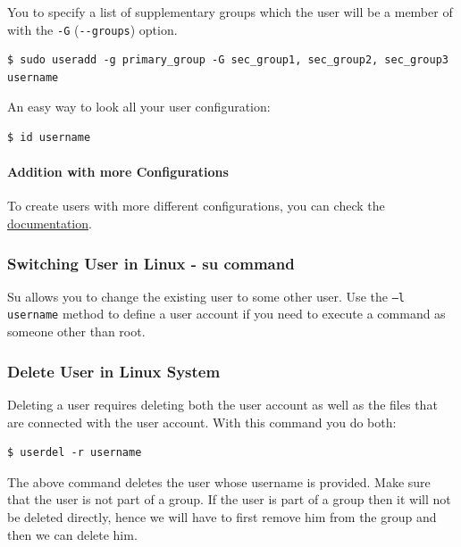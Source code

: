\documentclass{article}
\newenvironment{blocktemplateI}[1]{%
    \tcolorbox[beamer,%
    noparskip,breakable,
    colframe=Violet,%
    colbacklower=Black,%
    title=#1]}%
    {\endtcolorbox}
\newenvironment{blocktemplateIII}[1]{%
    \tcolorbox[beamer,%
    noparskip,breakable,
    ,colframe=Red,%
    colbacklower=LimeGreen!75!LightGreen,%
    title=#1]}%
    {\endtcolorbox}
\newenvironment{codetemplate}[1][]{%
  \mybasecolorbox[#1]
  \itshape
}{%
  \endmybasecolorbox
}
\begin{document}
You to specify a list of supplementary groups which the user will be a member of with the \verb|-G| (\verb|--groups|) option.
\begin{codetemplate}{}
\begin{verbatim}
$ sudo useradd -g primary_group -G sec_group1, sec_group2, sec_group3 username
\end{verbatim}
\end{codetemplate}

\begin{blocktemplateI}{NOTE}
An easy way to look all your user configuration:
\begin{codetemplate}{}
\begin{verbatim}
$ id username
\end{verbatim}
\end{codetemplate}
\end{blocktemplateI}

\paragraph{Addition with more Configurations}
To create users with more different configurations, you can check the \href{https://linuxize.com/post/how-to-create-users-in-linux-using-the-useradd-command/}{documentation}.

\subsubsection{Switching User in Linux - su command}

Su allows you to change the existing user to some other user. Use the \verb|–l username| method to define a user account if you need to execute a command as someone other than root.

\subsubsection{Delete User in Linux System}
 Deleting a user requires deleting both the user account as well as the files that are connected with the user account. With this command you do both:
\begin{codetemplate}{}
\begin{verbatim}
$ userdel -r username
\end{verbatim}
\end{codetemplate}

\begin{blocktemplateIII}{WARNING}
The above command deletes the user whose username is provided. Make sure that the user is not part of a group. If the user is part of a group then it will not be deleted directly, hence we will have to first remove him from the group and then we can delete him.  
\end{blocktemplateIII}
\end{document}
